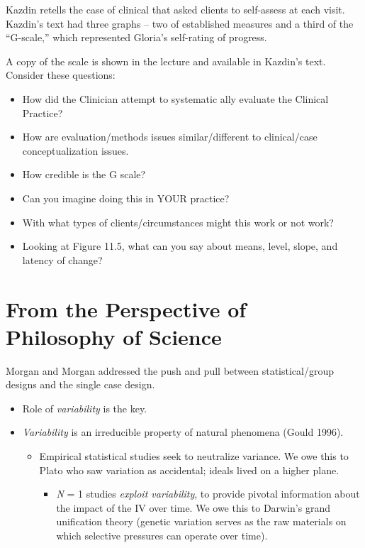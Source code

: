 \documentclass[
  english,
]{book}
\providecommand{\tightlist}{%
  \setlength{\itemsep}{0pt}\setlength{\parskip}{0pt}}
\begin{document}
Kazdin retells the case of clinical that asked clients to self-assess at each visit. Kazdin's text had three graphs -- two of established measures and a third of the ``G-scale,'' which represented Gloria's self-rating of progress.

A copy of the scale is shown in the lecture and available in Kazdin's text. Consider these questions:

\begin{itemize}
\tightlist
\item
  How did the Clinician attempt to systematic ally evaluate the Clinical Practice?
\item
  How are evaluation/methods issues similar/different to clinical/case conceptualization issues.
\item
  How credible is the G scale?
\item
  Can you imagine doing this in YOUR practice?
\item
  With what types of clients/circumstances might this work or not work?
\item
  Looking at Figure 11.5, what can you say about means, level, slope, and latency of change?
\end{itemize}

\hypertarget{from-the-perspective-of-philosophy-of-science}{%
\section{From the Perspective of Philosophy of Science}\label{from-the-perspective-of-philosophy-of-science}}

Morgan and Morgan \citeyearpar{morgan_single-participant_2001} addressed the push and pull between statistical/group designs and the single case design.

\begin{itemize}
\tightlist
\item
  Role of \emph{variability} is the key.
\item
  \emph{Variability} is an irreducible property of natural phenomena (Gould 1996).

  \begin{itemize}
  \tightlist
  \item
    Empirical statistical studies seek to neutralize variance. We owe this to Plato who saw variation as accidental; ideals lived on a higher plane.

    \begin{itemize}
    \tightlist
    \item
      \emph{N} = 1 studies \emph{exploit variability}, to provide pivotal information about the impact of the IV over time. We owe this to Darwin's grand unification theory (genetic variation serves as the raw materials on which selective pressures can operate over time).
    \end{itemize}
  \end{itemize}
\end{itemize}
\end{document}
